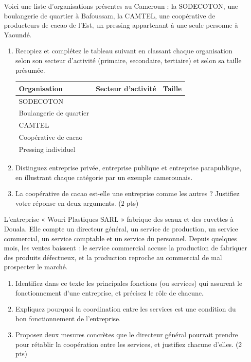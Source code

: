 \documentclass[11pt]{article}
\begin{document}
\begin{exercice}
Voici une liste d'organisations présentes au Cameroun : la SODECOTON, une boulangerie de quartier à Bafoussam, la CAMTEL, une coopérative de producteurs de cacao de l'Est, un pressing appartenant à une seule personne à Yaoundé.
\begin{enumerate}
\item Recopiez et complétez le tableau suivant en classant chaque organisation selon son secteur d'activité (primaire, secondaire, tertiaire) et selon sa taille présumée.

\begin{tabularx}{\linewidth}{|l|X|X|}
\hline
\textbf{Organisation} & \textbf{Secteur d'activité} & \textbf{Taille} \\
\hline
SODECOTON & & \\
\hline
Boulangerie de quartier & & \\
\hline
CAMTEL & & \\
\hline
Coopérative de cacao & & \\
\hline
Pressing individuel & & \\
\hline
\end{tabularx}

\item Distinguez entreprise privée, entreprise publique et entreprise parapublique, en illustrant chaque catégorie par un exemple camerounais.
\item La coopérative de cacao est-elle une entreprise comme les autres ? Justifiez votre réponse en deux arguments. (2 pts)
\end{enumerate}
\end{exercice}

\begin{exercice}
L'entreprise « Wouri Plastiques SARL » fabrique des seaux et des cuvettes à Douala. Elle compte un directeur général, un service de production, un service commercial, un service comptable et un service du personnel. Depuis quelques mois, les ventes baissent : le service commercial accuse la production de fabriquer des produits défectueux, et la production reproche au commercial de mal prospecter le marché.
\begin{enumerate}
\item Identifiez dans ce texte les principales fonctions (ou services) qui assurent le fonctionnement d'une entreprise, et précisez le rôle de chacune.
\item Expliquez pourquoi la coordination entre les services est une condition du bon fonctionnement de l'entreprise.
\item Proposez deux mesures concrètes que le directeur général pourrait prendre pour rétablir la coopération entre les services, et justifiez chacune d'elles. (2 pts)
\end{enumerate}
\end{exercice}
\end{document}
